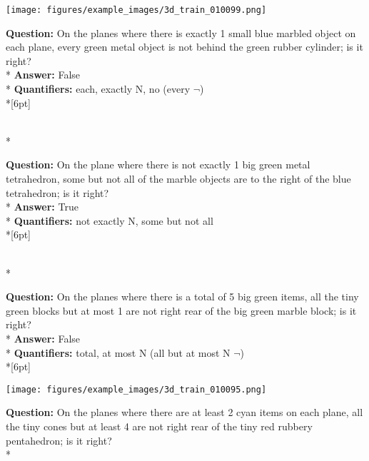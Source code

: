 \begin{figure*}  
\begin{minipage}{0.48\textwidth}
    \texttt{[image: figures/example\_images/3d\_train\_010099.png]}
    \begin{minipage}[t][2.2cm][t]{1\textwidth}
      \footnotesize
      \textbf{Question:} On the planes where there is exactly 1 small blue marbled object on each plane, every green metal object is not behind the green rubber cylinder; is it right? \\*
      \textbf{Answer:}  False \\*
      \textbf{Quantifiers:}  each, exactly N, no (every $\neg$)\\*[6pt]
    \end{minipage}\\*
    \begin{minipage}[t][2.2cm][t]{1\textwidth}
      \footnotesize
      \textbf{Question:} On the plane where there is not exactly 1 big green metal tetrahedron, some but not all of the marble objects are to the right of the blue tetrahedron; is it right? \\*
      \textbf{Answer:} True \\*
      \textbf{Quantifiers:}  not exactly N, some but not all\\*[6pt]
    \end{minipage}\\*
    \begin{minipage}[t][2.2cm][t]{1\textwidth}
      \footnotesize
      \textbf{Question:} On the planes where there is a total of 5 big green items, all the tiny green blocks but at most 1 are not right rear of the big green marble block; is it right? \\*
      \textbf{Answer:} False \\*
      \textbf{Quantifiers:} total, at most N (all but at most N $\neg$) \\*[6pt]
    \end{minipage}
  \end{minipage}
  \hspace{3.5mm}
  \begin{minipage}{0.48\textwidth}
    \texttt{[image: figures/example\_images/3d\_train\_010095.png]}
    \begin{minipage}[t][2.2cm][t]{1\textwidth}
      \footnotesize
      \textbf{Question:}  On the planes where there are at least 2 cyan items on each plane, all the tiny cones but at least 4 are not right rear of the tiny red rubbery pentahedron; is it right? \\*

\end{minipage}
\end{minipage}
\end{figure*}
